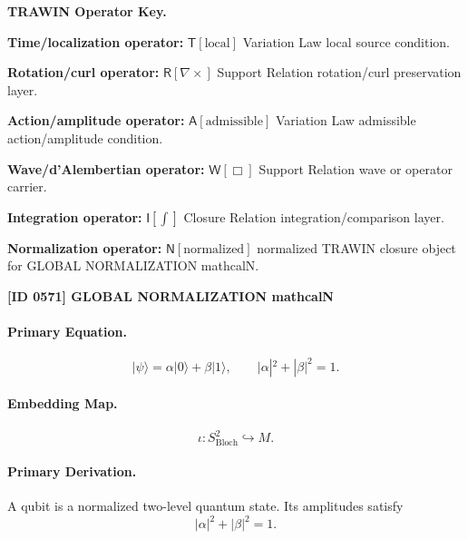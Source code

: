 \par\vspace{0.45\baselineskip}
\noindent\begin{minipage}[t]{\linewidth}
\begingroup
\small
\raggedright
\textbf{TRAWIN Operator Key.}\par
\noindent\textbf{Time/localization operator:} $\mathsf{T}\!\left[\mathrm{local}\right]$ Variation Law local source condition.\par
\noindent\textbf{Rotation/curl operator:} $\mathsf{R}\!\left[\nabla\times\right]$ Support Relation rotation/curl preservation layer.\par
\noindent\textbf{Action/amplitude operator:} $\mathsf{A}\!\left[\mathrm{admissible}\right]$ Variation Law admissible action/amplitude condition.\par
\noindent\textbf{Wave/d'Alembertian operator:} $\mathsf{W}\!\left[\Box\right]$ Support Relation wave or operator carrier.\par
\noindent\textbf{Integration operator:} $\mathsf{I}\!\left[\int\right]$ Closure Relation integration/comparison layer.\par
\noindent\textbf{Normalization operator:} $\mathsf{N}\!\left[\mathrm{normalized}\right]$ normalized TRAWIN closure object for GLOBAL NORMALIZATION mathcalN.\par
\endgroup
\end{minipage}

\clearpage
\noindent\textbf{[ID 0571] GLOBAL NORMALIZATION mathcalN}\par
\vspace{0.35em}
\paragraph{Primary Equation.}
\begin{equation}
|\psi\rangle = \alpha|0\rangle+\beta|1\rangle,
\qquad
|\alpha|^2+|\beta|^2=1 .
\end{equation}

\paragraph{Embedding Map.}
\begin{equation}
\iota:S^2_{\mathrm{Bloch}}\hookrightarrow M .
\end{equation}

\paragraph{Primary Derivation.}
A qubit is a normalized two-level quantum state. Its amplitudes satisfy
\begin{equation}
|\alpha|^2+|\beta|^2=1 .
\end{equation}

